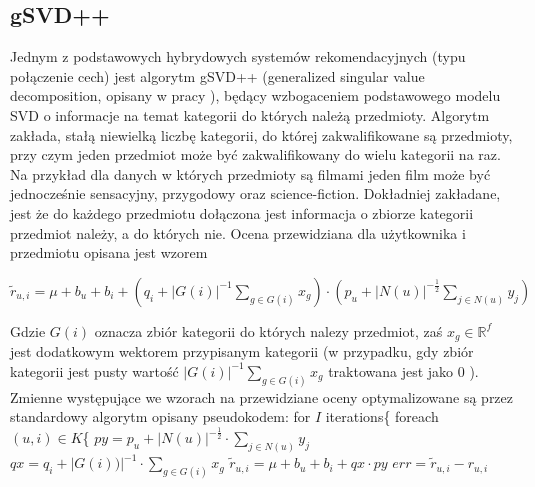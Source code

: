 \documentclass{pracamgr}
\begin{document}
   \subsection{gSVD++}
    Jednym z podstawowych hybrydowych systemów rekomendacyjnych (typu połączenie cech) jest algorytm gSVD++
    (generalized singular value decomposition, opisany w pracy \cite{gSVD++}),
    będący wzbogaceniem podstawowego modelu SVD o informacje na temat kategorii do których należą przedmioty.
    Algorytm zakłada, stałą niewielką liczbę kategorii, do której zakwalifikowane są przedmioty, przy czym jeden przedmiot może być zakwalifikowany do wielu
    kategorii na raz.
    Na przykład dla danych w których przedmioty są filmami jeden film może być jednocześnie sensacyjny, przygodowy oraz science-fiction.
    Dokładniej zakładane, jest że do każdego przedmiotu dołączona jest informacja o zbiorze kategorii przedmiot należy, a do których nie.\newline
    Ocena przewidziana dla użytkownika i przedmiotu opisana jest wzorem
    \begin{center}
     $\tilde{r}_{u,i}=\mu+b_u+b_i+\left(q_i+|G(i)|^{-1}\sum\limits_{g\in G(i)}x_{g}\right)\cdot\left(p_u +|N(u)|^{-\frac{1}{2}}\sum\limits_{j\in N(u)}y_j\right)$
    \end{center}
    Gdzie $G(i)$ oznacza zbiór kategorii do których nalezy przedmiot, zaś $x_{g}\in\mathbb{R}^f$ jest dodatkowym wektorem przypisanym kategorii
    (w przypadku, gdy zbiór kategorii jest pusty wartość $|G(i)|^{-1}\sum\limits_{g\in G(i)}x_{g}$ traktowana jest jako $0$ ).
    Zmienne występujące we wzorach na przewidziane oceny optymalizowane są przez standardowy algorytm opisany pseudokodem:\newline\newline
    \hspace*{16pt}	for $I$ iterations\{\newline
    \hspace*{32pt}		foreach $(u,i)\in K$\{\newline
    \hspace*{48pt}			$py=p_u +|N(u)|^{-\frac{1}{2}}\cdot\sum\limits_{j\in N(u)}y_j$\newline
    \hspace*{48pt}			$qx=q_i +|G(i))|^{-1}\cdot\sum\limits_{g\in G(i)}x_g$\newline
    \hspace*{48pt}			$\tilde{r}_{u,i}=\mu+b_u+b_i+qx\cdot py$\newline
    \hspace*{48pt}			$err=\tilde{r}_{u,i}-r_{u,i}$\newline
\end{document}
